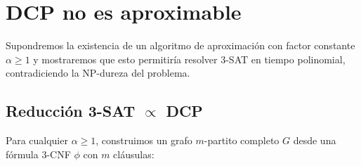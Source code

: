 \documentclass[letterpaper, 12pt]{report}
\begin{document}










\section{DCP no es aproximable}

Supondremos la existencia de un algoritmo de aproximación con factor constante $\alpha \geq 1$ y mostraremos que esto permitiría resolver 3-SAT en tiempo polinomial, contradiciendo la NP-dureza del problema.


\subsection{Reducción 3-SAT $\propto$ DCP}
Para cualquier $\alpha \geq 1$, construimos un grafo $m$-partito completo $G$ desde una fórmula 3-CNF $\phi$ con $m$ cláusulas:
\end{document}
